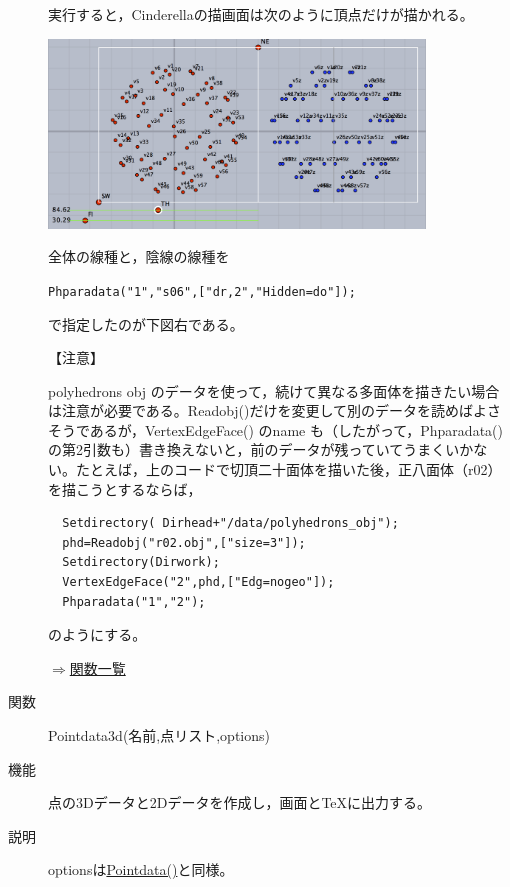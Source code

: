 \documentclass[papersize,a4paper,12pt,uplatex]{jsarticle}
\begin{document}
\begin{description}
実行すると，Cinderellaの描画面は次のように頂点だけが描かれる。

\vspace{\baselineskip}
\begin{center}
 \includegraphics[bb=0 0 726.04 365.02 , width=10cm]{Fig/phparadata01.pdf}
\end{center}
 
\vspace{\baselineskip}
全体の線種と，陰線の線種を
  
\verb|Phparadata("1","s06",["dr,2","Hidden=do"]);|

で指定したのが下図右である。

 \begin{center}     \end{center}

【注意】

  polyhedrons obj のデータを使って，続けて異なる多面体を描きたい場合は注意が必要である。Readobj()だけを変更して別のデータを読めばよさそうであるが，VertexEdgeFace() のname も（したがって，Phparadata()の第2引数も）書き換えないと，前のデータが残っていてうまくいかない。たとえば，上のコードで切頂二十面体を描いた後，正八面体（r02）を描こうとするならば，
\begin{verbatim}
  Setdirectory( Dirhead+"/data/polyhedrons_obj");
  phd=Readobj("r02.obj",["size=3"]);
  Setdirectory(Dirwork);
  VertexEdgeFace("2",phd,["Edg=nogeo"]);
  Phparadata("1","2");
\end{verbatim}
  のようにする。
  

\begin{flushright} \hyperlink{functionlist}{$\Rightarrow$関数一覧}\end{flushright}

\hypertarget{pointdata3d}{}
\item[関数]  Pointdata3d(名前,点リスト,options)
\item[機能]  点の3Dデータと2Dデータを作成し，画面と\TeX に出力する。
\item[説明]  optionsは\hyperlink{pointdata}{Pointdata()}と同様。
\vspace{\baselineskip}


\end{description}
\end{document}
